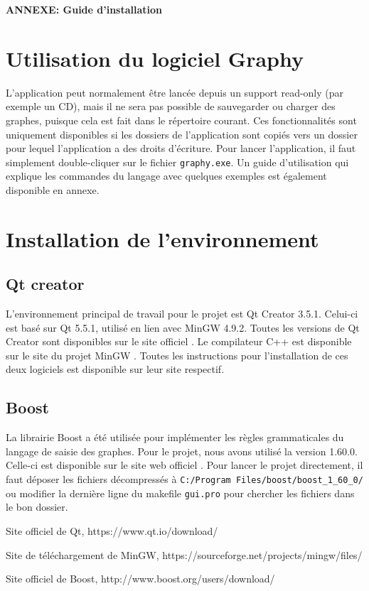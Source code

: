 \documentclass[french]{article}
\begin{document}
	\centering
	\large{\textbf{ANNEXE: Guide d'installation}}
	
	\justifying
	\normalsize
	
	\section{Utilisation du logiciel Graphy}
	L'application peut normalement être lancée depuis un support read-only (par exemple un CD), mais il ne sera pas possible de sauvegarder ou charger des graphes, puisque cela est fait dans le répertoire courant. Ces fonctionnalités sont uniquement disponibles si les dossiers de l'application sont copiés vers un dossier pour lequel l'application a des droits d'écriture. Pour lancer l'application, il faut simplement double-cliquer sur le fichier \texttt{graphy.exe}. Un guide d'utilisation qui explique les commandes du langage avec quelques exemples est également disponible en annexe.
	
	\section{Installation de l'environnement}
		\subsection{Qt creator}
		L'environnement principal de travail pour le projet est Qt Creator 3.5.1. Celui-ci est basé sur Qt 5.5.1, utilisé en lien avec MinGW 4.9.2. Toutes les versions de Qt Creator sont disponibles sur le site officiel \cite{qt}. Le compilateur C++ est disponible sur le site du projet MinGW \cite{minGW}. Toutes les instructions pour l'installation de ces deux logiciels est disponible sur leur site respectif.
	
		\subsection{Boost}
		La librairie Boost a été utilisée pour implémenter les règles grammaticales du langage de saisie des graphes. Pour le projet, nous avons utilisé la version 1.60.0. Celle-ci est disponible sur le site web officiel \cite{boost}. Pour lancer le projet directement, il faut déposer les fichiers décompressés à \texttt{C:/Program Files/boost/boost_1_60_0/} ou modifier la dernière ligne du makefile \texttt{gui.pro} pour chercher les fichiers dans le bon dossier.
	
	\begin{thebibliography}{9}
		Site officiel de Qt, https://www.qt.io/download/
		
		Site de téléchargement de MinGW, https://sourceforge.net/projects/mingw/files/
		
		Site officiel de Boost, http://www.boost.org/users/download/
	\end{thebibliography}
	
\end{document}

